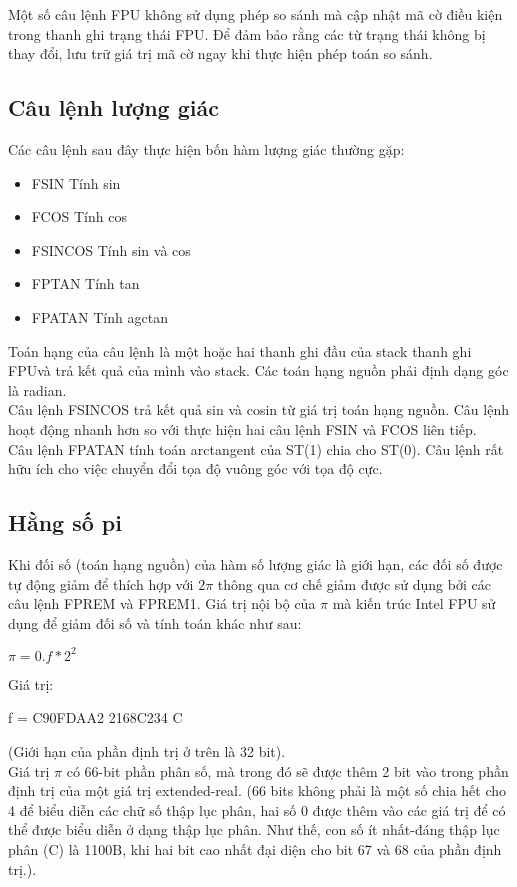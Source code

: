 		Một số câu lệnh FPU không sử dụng phép so sánh mà cập nhật mã cờ điều kiện trong thanh ghi trạng thái FPU. Để đảm bảo rằng các từ trạng thái không bị thay đổi, lưu trữ giá trị mã cờ ngay khi thực hiện phép toán so sánh.
		
			\subsection*{Câu lệnh lượng giác}
		Các câu lệnh sau đây thực hiện bốn hàm lượng giác thường gặp:
		\begin{itemize}
				\renewcommand{\labelitemi}{}
				\item	FSIN Tính sin
				\item	FCOS Tính cos
				\item	FSINCOS Tính sin và cos
				\item	FPTAN Tính tan
				\item	FPATAN Tính agctan
		\end{itemize}

		Toán hạng của câu lệnh là một hoặc hai thanh ghi đầu của stack thanh ghi FPUvà trả kết quả của mình vào stack. Các toán hạng nguồn phải định dạng góc là radian.\\
		
		Câu lệnh FSINCOS trả kết quả sin và cosin từ giá trị toán hạng nguồn. Câu lệnh hoạt động nhanh hơn so với thực hiện hai câu lệnh FSIN và FCOS liên tiếp.\\
		
		Câu lệnh FPATAN tính toán arctangent của ST(1) chia cho ST(0). Câu lệnh rất hữu ích cho việc chuyển đổi tọa độ vuông góc với tọa độ cực.

	\subsection*{Hằng số pi}
	Khi đối số (toán hạng nguồn) của hàm số lượng giác là giới hạn, các đối số được tự động giảm để thích hợp với $2\pi$ thông qua cơ chế giảm được sử dụng bởi các câu lệnh FPREM và FPREM1. Giá trị nội bộ của $\pi$ mà kiến trúc Intel FPU sử dụng để giảm đối số và tính toán khác như sau:
	
	
		$\pi = 0.f * 2^{2}$
		
		
		Giá trị:
		
		
		f = C90FDAA2 2168C234 C
		
		
		(Giới hạn của phần định trị ở trên là 32 bit). \\
		
		
		Giá trị  $\pi$ có 66-bit phần phân số, mà trong đó sẽ được thêm 2 bit vào trong phần định trị của một giá trị extended-real. (66 bits không phải là một số chia hết cho 4 để biểu diễn các chữ số thập lục phân, hai số 0 được thêm vào các giá trị để có thể được biểu diễn ở dạng thập lục phân. Như thế, con số ít nhất-đáng thập lục phân (C) là 1100B, khi hai bit cao nhất đại diện cho bit 67 và 68 của phần định trị.).\\
		
